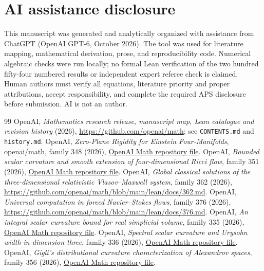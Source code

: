 \documentclass[aps,prd,onecolumn,notitlepage,groupedaddress,11pt]{revtex4-2}
\begin{document}
\section*{AI assistance disclosure}
This manuscript was generated and analytically organized with assistance from ChatGPT (OpenAI GPT-6, October 2026). The tool was used for literature mapping, mathematical derivation, prose, and reproducibility code. Numerical algebraic checks were run locally; no formal Lean verification of the two hundred fifty-four numbered results or independent expert referee check is claimed. Human authors must verify all equations, literature priority and proper attributions, accept responsibility, and complete the required APS disclosure before submission. AI is not an author.
\begin{thebibliography}{99}
 OpenAI, \emph{Mathematics research release, manuscript map, Lean catalogue and revision history} (2026), \url{https://github.com/openai/math}; see \texttt{CONTENTS.md} and \texttt{history.md}.
 OpenAI, \emph{Zero-Plane Rigidity for Einstein Four-Manifolds}, openai/math, family 348 (2026), \href{https://github.com/openai/math/tree/main/preprints/Zero-Plane-Rigidity-for-Einstein-Four-Manifolds-October-4-2026}{OpenAI Math repository file}.
 OpenAI, \emph{Bounded scalar curvature and smooth extension of four-dimensional Ricci flow}, family 351 (2026), \href{https://github.com/openai/math/tree/main/preprints/Bounded-scalar-curvature-and-smooth-extension-of-four-dimensional-Ricci-flow-September-24-2026}{OpenAI Math repository file}.
 OpenAI, \emph{Global classical solutions of the three-dimensional relativistic Vlasov--Maxwell system}, family 362 (2026), \url{https://github.com/openai/math/blob/main/lean/docs/362.md}.
 OpenAI, \emph{Universal computation in forced Navier--Stokes flows}, family 376 (2026), \url{https://github.com/openai/math/blob/main/lean/docs/376.md}.
 OpenAI, \emph{An integral scalar curvature bound for real simplicial volume}, family 335 (2026), \href{https://github.com/openai/math/tree/main/preprints/An-integral-scalar-curvature-bound-for-real-simplicial-volume-October-5-2026}{OpenAI Math repository file}.
 OpenAI, \emph{Spectral scalar curvature and Urysohn width in dimension three}, family 336 (2026), \href{https://github.com/openai/math/tree/main/preprints/Spectral-scalar-curvature-and-Urysohn-width-in-dimension-three-October-5-2026}{OpenAI Math repository file}.
 OpenAI, \emph{Gigli's distributional curvature characterization of Alexandrov spaces}, family 356 (2026), \href{https://github.com/openai/math/tree/main/preprints/Giglis-distributional-curvature-characterization-of-Alexandrov-spaces-September-24-2026}{OpenAI Math repository file}.

\end{thebibliography}
\end{document}
